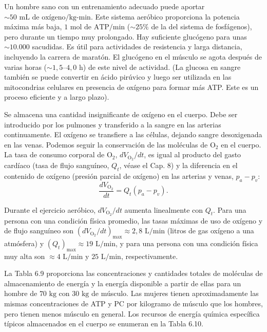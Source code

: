 \documentclass[12pt]{book}
\begin{document}
Un hombre sano con un entrenamiento adecuado puede aportar $\sim 50\text{ mL de oxígeno/kg-min}$. Este sistema aeróbico proporciona la potencia máxima más baja, $1\text{ mol de ATP/min}$ ($\sim 25\%$ de la del sistema de fosfágenos), pero durante un tiempo muy prolongado. Hay suficiente glucógeno para unas $\sim 10.000$ sacudidas. Es útil para actividades de resistencia y larga distancia, incluyendo la carrera de maratón. El glucógeno en el músculo se agota después de varias horas ($\sim 1,5\text{--}4,0\text{ h}$) de este nivel de actividad. (La glucosa en sangre también se puede convertir en ácido pirúvico y luego ser utilizada en las mitocondrias celulares en presencia de oxígeno para formar más ATP. Este es un proceso eficiente y a largo plazo).

Se almacena una cantidad insignificante de oxígeno en el cuerpo. Debe ser introducido por los pulmones y transferido a la sangre en las arterias continuamente. El oxígeno se transfiere a las células, dejando sangre desoxigenada en las venas. Podemos seguir la conservación de las moléculas de $\text{O}_2$ en el cuerpo. La tasa de consumo corporal de $\text{O}_2$, $d V_{\text{O}_2}/dt$, es igual al producto del gasto cardíaco (tasa de flujo sanguíneo, $Q_t$, véase el Cap. 8) y la diferencia en el contenido de oxígeno (presión parcial de oxígeno) en las arterias y venas, $p_a - p_v$:
\begin{equation}
\frac{d V_{\text{O}_2}}{dt} = Q_t(p_a - p_v).
\label{eq:618}
\end{equation}

Durante el ejercicio aeróbico, $d V_{\text{O}_2}/dt$ aumenta linealmente con $Q_t$. Para una persona con una condición física promedio, las tasas máximas de uso de oxígeno y de flujo sanguíneo son $(d V_{\text{O}_2}/dt)_{\text{max}} \approx 2,8\text{ L/min}$ (litros de gas oxígeno a una atmósfera) y $(Q_t)_{\text{max}} \approx 19\text{ L/min}$, y para una persona con una condición física muy alta son $\approx 4\text{ L/min}$ y $25\text{ L/min}$, respectivamente.

La Tabla 6.9 proporciona las concentraciones y cantidades totales de moléculas de almacenamiento de energía y la energía disponible a partir de ellas para un hombre de $70\text{ kg}$ con $30\text{ kg}$ de músculo. Las mujeres tienen aproximadamente las mismas concentraciones de ATP y $\text{PC}$ por kilogramo de músculo que los hombres, pero tienen menos músculo en general. Los recursos de energía química específica típicos almacenados en el cuerpo se enumeran en la Tabla 6.10.
\end{document}
